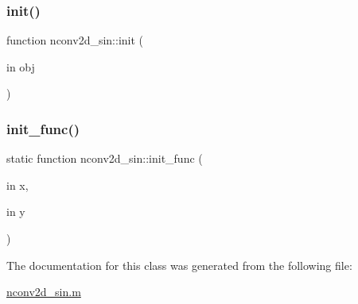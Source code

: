 \subsubsection{\texorpdfstring{init()}{init()}}
{\footnotesize\ttfamily function nconv2d\+\_\+sin\+::init (\begin{DoxyParamCaption}\item[{in}]{obj }\end{DoxyParamCaption})}

\mbox{\label{classnconv2d__sin_a28faa20a3a56cd56bd4dc1638f67e6c4}} 
\subsubsection{\texorpdfstring{init\+\_\+func()}{init\_func()}}
{\footnotesize\ttfamily static function nconv2d\+\_\+sin\+::init\+\_\+func (\begin{DoxyParamCaption}\item[{in}]{x,  }\item[{in}]{y }\end{DoxyParamCaption})\hspace{0.3cm}{\ttfamily [static]}}



The documentation for this class was generated from the following file\+:\begin{DoxyCompactItemize}
\item 
\hyperlink{nconv2d__sin_8m}{nconv2d\+\_\+sin.\+m}\end{DoxyCompactItemize}
